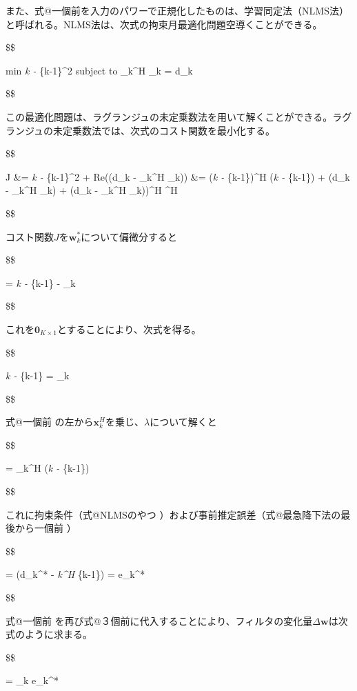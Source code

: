 また、式@一個前を入力のパワーで正規化したものは、学習同定法（NLMS法）と呼ばれる。NLMS法は、次式の拘束月最適化問題空導くことができる。

\$\$

min \textbar\textbar{}\emph{k -
}\{k-1\}\textbar\textbar\^{}2 subject to \_k\^{}H \_k
= d\_k

\$\$

この最適化問題は、ラグランジュの未定乗数法を用いて解くことができる。ラグランジュの未定乗数法では、次式のコスト関数を最小化する。

\$\$

J \&= \textbar\textbar{}\emph{k -
}\{k-1\}\textbar\textbar\^{}2 + Re(\lambda (d\_k - \_k\^{}H
\_k)) \&= (\emph{k - }\{k-1\})\^{}H (\emph{k -
}\{k-1\}) + \lambda (d\_k - \_k\^{}H \_k) + (d\_k -
\_k\^{}H \_k))\^{}H \lambda\^{}H

\$\$

コスト関数\(J\)を\(\bm{w}_k^*\)について偏微分すると

\$\$

 = \emph{k - }\{k-1\}
- \lambda {}\_k

\$\$

これを\(\bm{0}_{K \times 1}\)とすることにより、次式を得る。

\$\$

\emph{k - }\{k-1\} = \lambda {}\_k

\$\$

式@一個前 の左から\(\bm{x}_k^H\)を乗じ、\(\lambda\)について解くと

\$\$

\lambda =  \_k\^{}H (\emph{k -
}\{k-1\})

\$\$

これに拘束条件（式@NLMSのやつ
）および事前推定誤差（式@最急降下法の最後から一個前 ）

\$\$

\lambda =  (d\_k\^{}* - \emph{k\^{}H
}\{k-1\}) =  e\_k\^{}*

\$\$

式@一個前
を再び式@３個前に代入することにより、フィルタの変化量\(\Delta \bm{w}\)は次式のように求まる。

\$\$

\Delta {} =  \_k e\_k\^{}*

